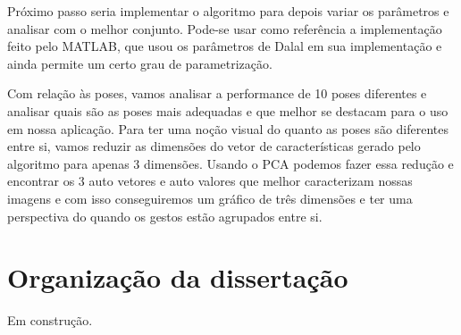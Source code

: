 Próximo passo seria implementar o algoritmo para depois variar os parâmetros e analisar com o melhor conjunto. Pode-se usar como referência a implementação feito pelo MATLAB, que usou os parâmetros de Dalal \cite{dalal} em sua implementação e ainda permite um certo grau de parametrização.

Com relação às poses, vamos analisar a performance de 10 poses diferentes e analisar quais são as poses mais adequadas e que melhor se destacam para o uso em nossa aplicação. Para ter uma noção visual do quanto as poses são diferentes entre si, vamos reduzir as dimensões do vetor de características gerado pelo algoritmo para apenas 3 dimensões. Usando o PCA podemos fazer essa redução e encontrar os 3 auto vetores e auto valores que melhor caracterizam nossas imagens e com isso conseguiremos um gráfico de três dimensões e ter uma perspectiva do quando os gestos estão agrupados entre si.

\section{Organização da dissertação}

Em construção.

